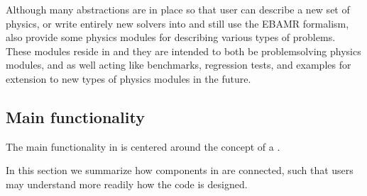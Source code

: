 \documentclass[letterpaper,10pt,english]{sphinxmanual}
\begin{document}
Although many abstractions are in place so that user can describe a new set of physics, or write entirely new solvers into  and still use the EBAMR formalism,  also provide some physics modules for describing various types of problems.
These modules reside in  and they are intended to both be problem\sphinxhyphen{}solving physics modules, and as well acting like benchmarks, regression tests, and examples for extension to new types of physics modules in the future.


\subsection{Main functionality}
\label{\detokenize{Model:main-functionality}}
The main functionality in  is centered around the concept of a {\hyperref[\detokenize{Solver:chap-solver}]{}}.

In this section we summarize how components in  are connected, such that users may understand more readily how the code is designed.
\end{document}
